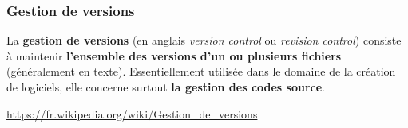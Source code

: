\documentclass[table,tikz,12pt,svgnames]{beamer}
\begin{document}
\begin{frame}
	\frametitle{Gestion de versions}
		\begin{block}{}
				La \textbf{gestion de versions} (en anglais \textit{version control} ou \textit{revision control}) consiste à maintenir \textbf{l'ensemble des versions d'un ou plusieurs fichiers} (généralement en texte).
				Essentiellement utilisée dans le domaine de la création de logiciels, elle concerne surtout \textbf{la gestion des codes source}.
		\end{block}
		\begin{block}{}
		\small \url{https://fr.wikipedia.org/wiki/Gestion\_de\_versions}
		\end{block}
\end{frame}
\end{document}
